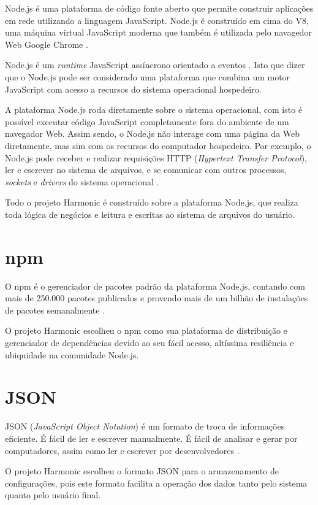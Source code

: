 \documentclass[ppginf, pep]{esinucpel}
\begin{document}
Node.js é uma plataforma de código fonte aberto que permite construir aplicações em rede utilizando a linguagem JavaScript. Node.js é construído em cima do V8, uma máquina virtual JavaScript moderna que também é utilizada pelo navagedor Web Google Chrome \cite{instant_nodejs_starter:03}.

Node.js é um \textit{runtime} JavaScript assíncrono orientado a eventos \cite{nodejs}. Isto que dizer que o Node.js pode ser considerado uma plataforma que combina um motor JavaScript com acesso a recursos do sistema operacional hospedeiro.

A plataforma Node.js roda diretamente sobre o sistema operacional, com isto é possível executar código JavaScript completamente fora do ambiente de um navegador Web. Assim sendo, o Node.js não interage com uma página da Web diretamente, mas sim com os recursos do computador hospedeiro. Por exemplo, o Node.js pode receber e realizar requisições HTTP (\textit{Hypertext Transfer Protocol}), ler e escrever no sistema de arquivos, e se comunicar com outros processos, \textit{sockets} e \textit{drivers} do sistema operacional \cite{javaworld}.

Todo o projeto Harmonic é construído sobre a plataforma Node.js, que realiza toda lógica de negócios e leitura e escritas ao sistema de arquivos do usuário.

\section{npm}

O npm é o gerenciador de pacotes padrão da plataforma Node.js, contando com mais de 250.000 pacotes publicados \cite{npm} e provendo mais de um bilhão de instalações de pacotes semanalmente \cite{npm_packages}.

O projeto Harmonic escolheu o npm como sua plataforma de distribuição e gerenciador de dependências devido ao seu fácil acesso, altíssima resiliência e ubiquidade na comunidade Node.js.

\section{JSON}

JSON (\textit{JavaScript Object Notation}) é um formato de troca de informações eficiente. É fácil de ler e escrever manualmente. É fácil de analisar e gerar por computadores, assim como ler e escrever por desenvolvedores \cite{json}.

O projeto Harmonic escolheu o formato JSON para o armazenamento de configurações, pois este formato facilita a operação dos dados tanto pelo sistema quanto pelo usuário final.
\end{document}
